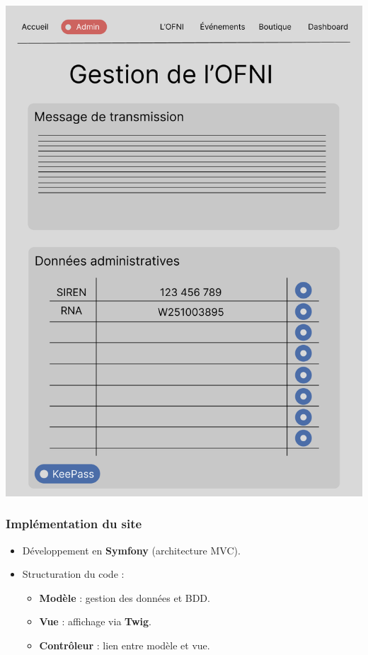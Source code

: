 \documentclass[pdf]{beamer}
\begin{document}
\begin{frame}
\begin{minipage}{0.48\textwidth}
        \includegraphics[width=\linewidth]{../0-report/assets/pictures/figma.png}
    \end{minipage}
\end{frame}

\begin{frame}
    \frametitle{Implémentation du site}

    \begin{itemize}
        \item Développement en \textbf{Symfony} (architecture MVC).
        \item Structuration du code :
              \begin{itemize}
                \item \textbf{Modèle} : gestion des données et BDD.
                \item \textbf{Vue} : affichage via \textbf{Twig}.
                \item \textbf{Contrôleur} : lien entre modèle et vue.
              \end{itemize}
    \end{itemize}
\end{frame}
\end{document}
